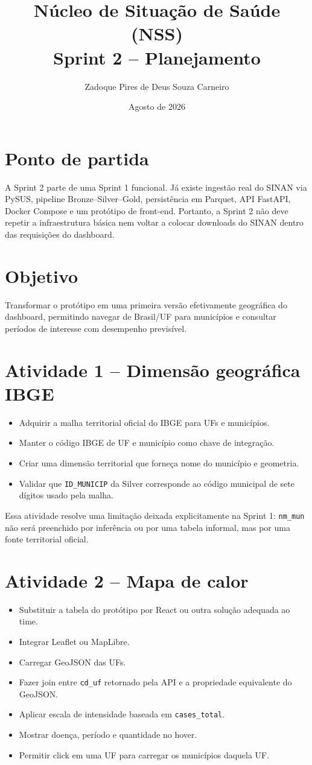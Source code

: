 \documentclass[12pt,a4paper]{article}
\title{Núcleo de Situação de Saúde (NSS)\\Sprint 2 -- Planejamento}
\author{Zadoque Pires de Deus Souza Carneiro}
\date{Agosto de 2026}
\begin{document}
\maketitle

\section{Ponto de partida}
A Sprint 2 parte de uma Sprint 1 funcional. Já existe ingestão real do SINAN via PySUS, pipeline Bronze--Silver--Gold, persistência em Parquet, API FastAPI, Docker Compose e um protótipo de front-end. Portanto, a Sprint 2 não deve repetir a infraestrutura básica nem voltar a colocar downloads do SINAN dentro das requisições do dashboard.

\section{Objetivo}
Transformar o protótipo em uma primeira versão efetivamente geográfica do dashboard, permitindo navegar de Brasil/UF para municípios e consultar períodos de interesse com desempenho previsível.

\section{Atividade 1 -- Dimensão geográfica IBGE}
\begin{itemize}
\item Adquirir a malha territorial oficial do IBGE para UFs e municípios.
\item Manter o código IBGE de UF e município como chave de integração.
\item Criar uma dimensão territorial que forneça nome do município e geometria.
\item Validar que \texttt{ID\_MUNICIP} da Silver corresponde ao código municipal de sete dígitos usado pela malha.
\end{itemize}

Essa atividade resolve uma limitação deixada explicitamente na Sprint 1: \texttt{nm\_mun} não será preenchido por inferência ou por uma tabela informal, mas por uma fonte territorial oficial.

\section{Atividade 2 -- Mapa de calor}
\begin{itemize}
\item Substituir a tabela do protótipo por React ou outra solução adequada ao time.
\item Integrar Leaflet ou MapLibre.
\item Carregar GeoJSON das UFs.
\item Fazer join entre \texttt{cd\_uf} retornado pela API e a propriedade equivalente do GeoJSON.
\item Aplicar escala de intensidade baseada em \texttt{cases\_total}.
\item Mostrar doença, período e quantidade no hover.
\item Permitir click em uma UF para carregar os municípios daquela UF.
\end{itemize}
\end{document}
